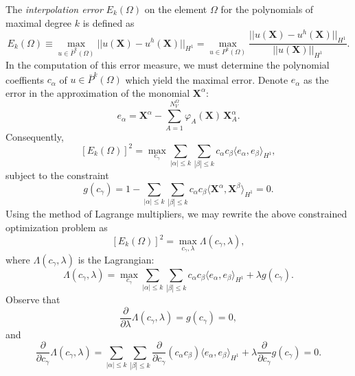 The \textit{interpolation error} $E_k (\Omega)$ on the element $\Omega$ for the polynomials of maximal degree $k$ is defined as
\begin{equation}
        E_k (\Omega) \equiv \max_{u \in \bar{P}^k (\Omega)} || u(\mathbf{X}) - u^h(\mathbf{X}) ||_{H^1} = \max_{u \in P^k (\Omega)} \frac{|| u(\mathbf{X}) - u^h(\mathbf{X}) ||_{H^1}}{|| u(\mathbf{X}) ||_{H^1}}.
\end{equation}
In the computation of this error measure, we must determine the polynomial coeffients $c_\alpha$ of $u \in \bar{P}^k (\Omega)$ which yield the maximal error. Denote $e_\alpha$ as the error in the approximation of the monomial $\mathbf{X}^\alpha$:
\begin{equation}
        e_\alpha = \mathbf{X}^{\alpha} - \sum_{A = 1}^{N^{\Omega}_V} \varphi_A (\mathbf{X}) \, \mathbf{X}_A^{\alpha}.
\end{equation}
Consequently,
\begin{equation}
        \left[ E_k (\Omega) \right]^2 = \max_{c_\gamma} \sum_{|\alpha| \leq k} \sum_{|\beta| \leq k} c_{\alpha} c_{\beta} \langle e_\alpha, e_\beta \rangle_{H^1},
\end{equation}
subject to the constraint
\begin{equation}
        g(c_\gamma) = 1 - \sum_{|\alpha| \leq k} \sum_{|\beta| \leq k} c_{\alpha} c_{\beta} \langle \mathbf{X}^\alpha, \mathbf{X}^\beta \rangle_{H^1} = 0.
\end{equation}
Using the method of Lagrange multipliers, we may rewrite the above constrained optimization problem as
\begin{equation}
        \left[ E_k (\Omega) \right]^2 = \max_{c_\gamma, \lambda} \Lambda (c_\gamma,\lambda),
\end{equation}
where $\Lambda (c_\gamma,\lambda)$ is the Lagrangian:
\begin{equation}
        \Lambda (c_\gamma, \lambda) = \max_{c_\gamma} \sum_{|\alpha| \leq  k} \sum_{|\beta| \leq k} c_{\alpha} c_{\beta} \langle e_\alpha, e_\beta \rangle_{H^1} + \lambda g(c_\gamma).
\end{equation}
Observe that
\begin{equation}
        \frac{\partial}{\partial \lambda} \Lambda (c_\gamma, \lambda) = g(c_\gamma) = 0,
\end{equation}
and
\begin{equation}
        \frac{\partial}{\partial c_\gamma} \Lambda (c_\gamma, \lambda) = \sum_{|\alpha| \leq k} \sum_{|\beta| \leq k} \frac{\partial}{\partial c_\gamma} (c_{\alpha} c_{\beta}) \langle e_\alpha, e_\beta \rangle_{H^1} + \lambda \frac{\partial}{\partial c_\gamma} g(c_\gamma) = 0.
\end{equation}
